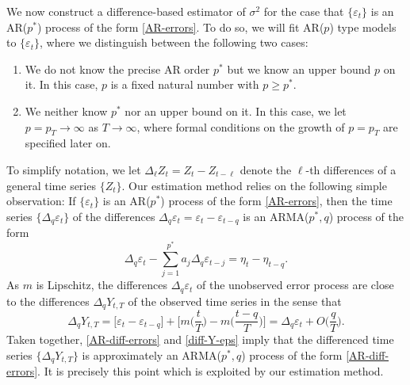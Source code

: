We now construct a difference-based estimator of $\sigma^2$ for the case that $\{\varepsilon_t\}$ is an AR($p^*$) process of the form \eqref{AR-errors}. To do so, we will fit AR($p$) type models to $\{\varepsilon_t\}$, where we distinguish between the following two cases: 
\begin{enumerate}[label=(\Alph*),leftmargin=0.75cm]
\item We do not know the precise AR order $p^*$ but we know an upper bound $p$ on it. In this case, $p$ is a fixed natural number with $ p \ge p^*$. 
\item We neither know $p^*$ nor an upper bound on it. In this case, we let $p = p_T \rightarrow \infty$ as $T \rightarrow \infty$, where formal conditions on the growth of $p = p_T$ are specified later on. 
\end{enumerate}
To simplify notation, we let $\Delta_\ell Z_t = Z_t - Z_{t-\ell}$ denote the $\ell$-th differences of a general time series $\{Z_t\}$. 
Our estimation method relies on the following simple observation: If $\{\varepsilon_t\}$ is an AR($p^*$) process of the form \eqref{AR-errors}, then the time series $\{ \Delta_q \varepsilon_t \}$ of the differences $\Delta_q \varepsilon_t = \varepsilon_t - \varepsilon_{t-q}$ is an ARMA($p^*,q$) process of the form 
\begin{equation}\label{AR-diff-errors} 
\Delta_q \varepsilon_t - \sum_{j=1}^{p^*} a_j \Delta_q \varepsilon_{t-j} = \eta_t - \eta_{t-q}. 
\end{equation}
As $m$ is Lipschitz, the differences $\Delta_q \varepsilon_t$ of the unobserved error process are close to the differences $\Delta_q Y_{t,T}$ of the observed time series in the sense that 
\begin{equation}\label{diff-Y-eps}
\Delta_q Y_{t,T} = \big[\varepsilon_t  - \varepsilon_{t-q} \big] + \Big[ m \Big(\frac{t}{T}\Big) - m \Big(\frac{t-q}{T}\Big) \Big] = \Delta_q \varepsilon_t + O \Big( \frac{q}{T} \Big).  
\end{equation} 
Taken together, \eqref{AR-diff-errors} and \eqref{diff-Y-eps} imply that the differenced time series $\{ \Delta_q Y_{t,T} \}$ is approximately an ARMA($p^*,q$) process of the form \eqref{AR-diff-errors}. It is precisely this point which is exploited by our estimation method. 


